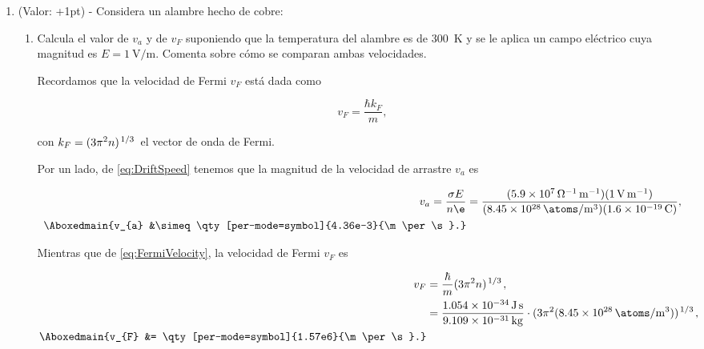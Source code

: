 \documentclass[./../main.tex]{subfiles}
\begin{document}
\begin{enumerate}
            \color{blue}
            \item (Valor: +1pt) - Considera un alambre hecho de cobre:
                \begin{enumerate}[label = (b.\arabic*)]
                    \item Calcula el valor de \(v_{a}\) y de \(v_{F}\) suponiendo que la temperatura del alambre es de \qty{300}{\kelvin} y se le aplica un campo eléctrico cuya magnitud es \(E = \qty{1}{\V\per\m}\). Comenta sobre cómo se comparan ambas velocidades.
                    
                    \color{black}
                    
                        Recordamos que la velocidad de Fermi \(v_{F}\) está dada como

                        \begin{equation}
                            v_{F} = \dfrac{\hbar k_{F}}{m},
                            \label{eq:FermiVelocity}
                        \end{equation}

                        con \(k_{F} = (3\pi^{2}n)^{\slashfrac{1}{3}}\) el vector de onda de Fermi.

                        Por un lado, de \cref{eq:DriftSpeed} tenemos que la magnitud de la velocidad de arrastre \(v_{a}\) es

                        \begin{align*}
                            v_{a} = \dfrac{\sigma E}{n\e} &= \dfrac{(\qty[per-mode=power]{5.9e7}{\per\ohm\per\m})(\qty{1}{\V\per\m})}{(\qty[per-mode=symbol]{8.45e28}{\atoms\per\m\cubed})(\qty{1.6e-19}{\C})},\\
                            \Aboxedmain{v_{a} &\simeq \qty[per-mode=symbol]{4.36e-3}{\m\per\s}.}
                        \end{align*}

                        Mientras que de \cref{eq:FermiVelocity}, la velocidad de Fermi \(v_{F}\) es

                        \begin{align}
                            v_{F} &= \dfrac{\hbar}{m}(3\pi^{2}n)^{\slashfrac{1}{3}},\label{eq:FermiVelocityComplete}\\
                            &= \dfrac{\qty{1.054e-34}{\J\s}}{\qty{9.109e-31}{\kg}}\cdot (3\pi^{2}(\qty[per-mode=symbol]{8.45e28}{\atoms\per\m\cubed}))^{\slashfrac{1}{3}},\nonumber\\
                            \Aboxedmain{v_{F} &= \qty[per-mode=symbol]{1.57e6}{\m\per\s}.}\label{eq:FermiVelocityForCopper}
                        \end{align}


\end{enumerate}
\end{enumerate}
\end{document}
